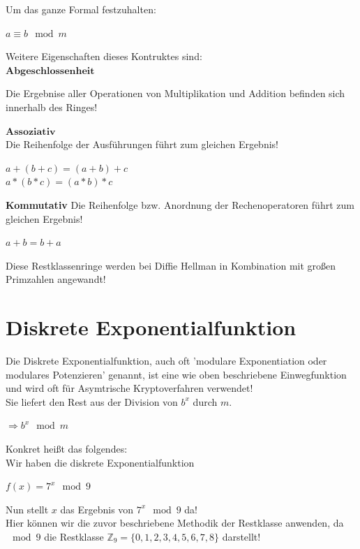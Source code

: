\documentclass[a4paper,12pt]{scrartcl}
\begin{document}
Um das ganze Formal festzuhalten:
 \\
 \begin{center}
   $a \equiv b \mod m$

 \end{center}
 
 Weitere Eigenschaften dieses Kontruktes sind:\\
 $\textbf{Abgeschlossenheit}$ 
 \begin{center}
   Die Ergebnise aller Operationen von Multiplikation und Addition befinden sich innerhalb des Ringes!

 \end{center}

 $\textbf{Assoziativ}$\\
Die Reihenfolge der Ausführungen führt zum gleichen Ergebnis!
\begin{center}
 $a + (b+c) = (a + b) + c$\\
$a * (b *c) = (a * b) * c$

\end{center}
\textbf{Kommutativ}
Die Reihenfolge bzw. Anordnung der Rechenoperatoren führt zum gleichen Ergebnis! \\
\begin{center}
 $a + b = b + a $
\end{center}



Diese Restklassenringe werden bei Diffie Hellman in Kombination mit großen Primzahlen angewandt!

\newpage
\section{ Diskrete Exponentialfunktion }

Die Diskrete Exponentialfunktion, auch oft 'modulare Exponentiation oder modulares Potenzieren' genannt, ist eine wie oben beschriebene Einwegfunktion und wird oft für Asymtrische Kryptoverfahren verwendet!\\
Sie liefert den Rest aus der Division von $b^{x}$ durch $m$.

\begin{center}
$\Rightarrow b^{x} \mod m $
\end{center}

Konkret heißt das folgendes:\\
Wir haben die diskrete Exponentialfunktion 
\begin{center}
 $f(x) = 7^x \mod 9$
\end{center}
Nun stellt $x$ das Ergebnis von $7^x \mod 9$ da! \\
Hier können wir die zuvor beschriebene Methodik der Restklasse anwenden, da $\mod 9$ die Restklasse $\mathbb{Z}_{9} = \{0,1,2,3,4,5,6,7,8\}$ darstellt!
\\
\end{document}
